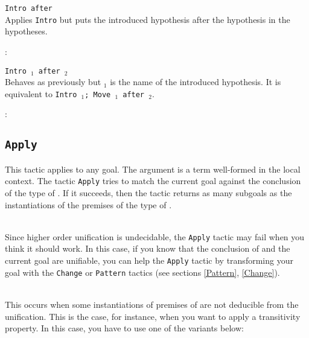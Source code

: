 \begin{Variants}
\item {\tt Intro after \ident}
  \\
  Applies {\tt Intro} but puts the introduced
  hypothesis after the hypothesis \ident{} in the hypotheses.

\begin{ErrMsgs}
\item {}
\item {} : {\ident}
\end{ErrMsgs}

\item {\tt Intro \ident$_1$ after \ident$_2$}
  \\
  Behaves as previously but \ident$_1$ is the name of the introduced
  hypothesis.
  It is equivalent to {\tt Intro \ident$_1$; Move \ident$_1$ after \ident$_2$}.

\begin{ErrMsgs}
\item {}
\item {} : {\ident}
\end{ErrMsgs}
\end{Variants}

\subsection{\tt Apply \term}
\label{Apply}
This tactic applies to any goal. 
The argument {\term} is a term well-formed in the local context.
The tactic {\tt Apply} tries to match the
current goal against the conclusion of the type of {\term}. If it
succeeds, then the tactic returns as many subgoals as the
instantiations of the premises of the type of
{\term}.

\begin{ErrMsgs}
\item {} \\
  Since higher order unification is undecidable, the {\tt Apply}
  tactic may fail when you think it should work.  In this case, if you
  know that the conclusion of {\term} and the current goal are
  unifiable, you can help the {\tt Apply} tactic by transforming your
  goal with the {\tt Change} or {\tt Pattern} tactics (see sections
  \ref{Pattern}, \ref{Change}).

\item {}\\
  This occurs when some instantiations of premises of {\term} are not
  deducible from the unification. This is the case, for instance, when
  you want to apply a transitivity property. In this case, you have to
  use one of the variants below:
\end{ErrMsgs}

